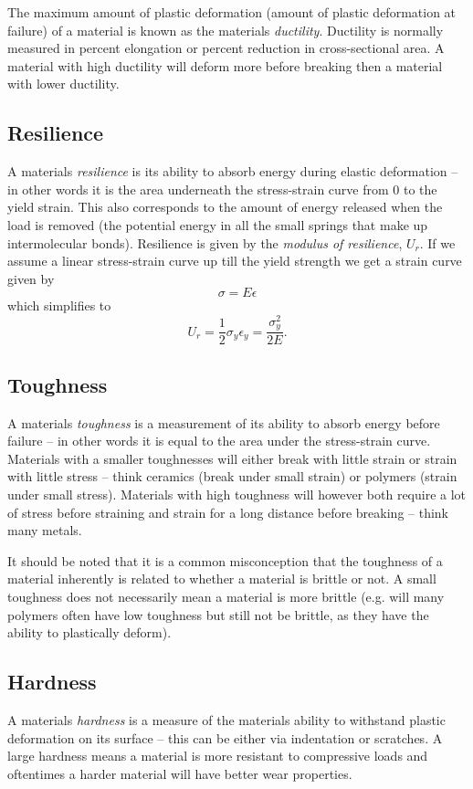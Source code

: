 The maximum amount of plastic deformation (amount of plastic deformation at failure) of a material is known as the materials \textit{ductility}. Ductility is normally measured in percent elongation or percent reduction in cross-sectional area. A material with high ductility will deform more before breaking then a material with lower ductility. 

\subsection{Resilience}
A materials \textit{resilience} is its ability to absorb energy during elastic deformation -- in other words it is the area underneath the stress-strain curve from 0 to the yield strain. This also corresponds to the amount of energy released when the load is removed (the potential energy in all the small springs that make up intermolecular bonds). Resilience is given by the \textit{modulus of resilience}, $U_r$. If we assume a linear stress-strain curve up till the yield strength we get a strain curve given by
\[ 
\sigma = E\epsilon
\]
which simplifies to
\[ 
U_r = \frac{1}{2}\sigma_y \epsilon_y = \frac{\sigma_y^2}{2E}
.\]

\subsection{Toughness}
A materials \textit{toughness} is a measurement of its ability to absorb energy before failure -- in other words it is equal to the area under the stress-strain curve. Materials with a smaller toughnesses will either break with little strain or strain with little stress -- think ceramics (break under small strain) or polymers (strain under small stress). Materials with high toughness will however both require a lot of stress before straining and strain for a long distance before breaking -- think many metals.

It should be noted that it is a common misconception that the toughness of a material inherently is related to whether a material is brittle or not. A small toughness does not necessarily mean a material is more brittle (e.g. will many polymers often have low toughness but still not be brittle, as they have the ability to plastically deform).


\subsection{Hardness}
A materials \textit{hardness} is a measure of the materials ability to withstand plastic deformation on its surface -- this can be either via indentation or scratches. A large hardness means a material is more resistant to compressive loads and oftentimes a harder material will have better wear properties.


